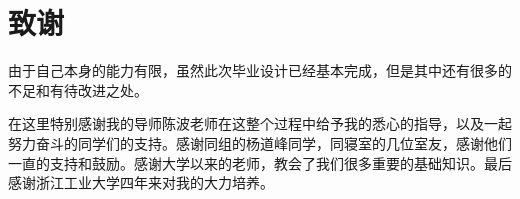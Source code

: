 
\chapter{\heiti\bfseries{致谢}}
由于自己本身的能力有限，虽然此次毕业设计已经基本完成，但是其中还有很多的不足和有待改进之处。

在这里特别感谢我的导师陈波老师在这整个过程中给予我的悉心的指导，以及一起努力奋斗的同学们的支持。感谢同组的杨道峰同学，同寝室的几位室友，感谢他们一直的支持和鼓励。感谢大学以来的老师，教会了我们很多重要的基础知识。最后感谢浙江工业大学四年来对我的大力培养。
